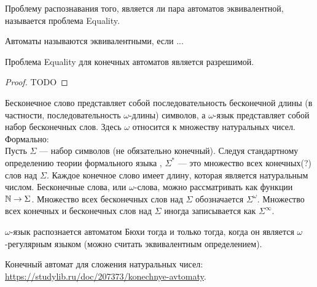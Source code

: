     \begin{Def}
        Проблему распознавания того, является ли пара автоматов эквивалентной, называется проблема Equality.
    \end{Def}
    \begin{Rem}
        Автоматы называются эквивалентными, если ...
    \end{Rem}
    \begin{Thm}
        Проблема Equality для конечных автоматов является разрешимой.
    \end{Thm}
    \begin{proof}
        TODO
    \end{proof}







    \begin{Def}
        Бесконечное слово представляет собой последовательность бесконечной длины (в частности, последовательность $\omega$-длины) символов, а $\omega$-язык представляет собой набор бесконечных слов. Здесь $\omega$ относится к множеству натуральных чисел.\\
        Формально:\\
        Пусть $\Sigma$ — набор символов (не обязательно конечный). Следуя стандартному определению теории формального языка , $\Sigma^*$ --- это множество всех конечных(?) слов над $\Sigma$. Каждое конечное слово имеет длину, которая является натуральным числом. Бесконечные слова, или $\omega$-слова, можно рассматривать как функции $\mathbb{N} \rightarrow \Sigma$. Множество всех бесконечных слов над $\Sigma$ обозначается $\Sigma^\omega$. Множество всех конечных и бесконечных слов над $\Sigma$ иногда записывается как $\Sigma^\infty$.
    \end{Def}
    \begin{Def}

    \end{Def}
    \begin{Rem}
        $\omega$-язык распознается автоматом Бюхи тогда и только тогда, когда он является $\omega$-регулярным языком (можно считать эквивалентным определением).
    \end{Rem}

    \begin{Example}
        Конечный автомат для сложения натуральных чисел: \url{https://studylib.ru/doc/207373/konechnye-avtomaty}.
    \end{Example}
